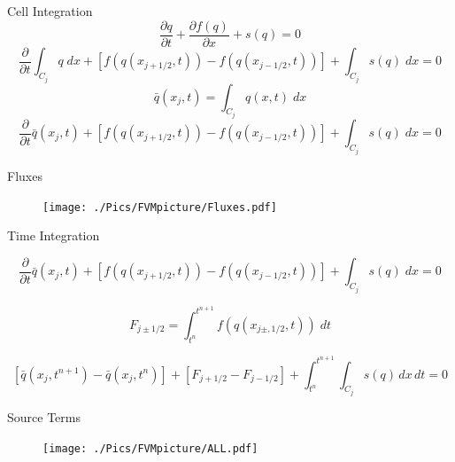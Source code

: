\documentclass[pdf]{beamer}
\begin{document}
\begin{frame}{Cell Integration}
	\begin{equation*}
	\frac{\partial q}{\partial t} + \frac{\partial f(q)}{\partial x} + s(q) = 0
	\end{equation*}
	\begin{equation*}
	\frac{\partial}{\partial t} \int_{C_j} q \; dx + \left[f(q(x_{j+1/2},t)) - f(q(x_{j-1/2},t))  \right] + \int_{C_j} s(q) \; dx  = 0
	\end{equation*}
	\begin{equation*}
	\bar{q}(x_j,t)= \int_{C_j} q(x,t) \; dx
	\end{equation*}
	\begin{equation*}
	\frac{\partial}{\partial t} \bar{q}(x_j,t) + \left[f(q(x_{j+1/2},t)) - f(q(x_{j-1/2},t))  \right] + \int_{C_j} s(q) \; dx  = 0
	\end{equation*}
\end{frame}
\begin{frame}{Fluxes}
	\begin{figure}
		\texttt{[image: ./Pics/FVMpicture/Fluxes.pdf]}
	\end{figure}
\end{frame}
\begin{frame}{Time Integration}
	
	\begin{equation*}
	\frac{\partial}{\partial t} \bar{q}(x_j,t) + \left[f(q(x_{j+1/2},t)) - f(q(x_{j-1/2},t))  \right] + \int_{C_j} s(q) \; dx  = 0
	\end{equation*}
	
	\begin{equation}
	F_{j \pm 1/2} = \int_{t^n}^{t^{n+1}} f(q(x_{j\pm,1/2},t)) \; dt
	\end{equation}
	
	\begin{equation}
	\left[\bar{q}(x_j,t^{n+1}) - \bar{q}(x_j,t^n)\right]+ \left[F_{j + 1/2} - F_{j - 1/2} \right] +  \int_{t^n}^{t^{n+1}} \int_{C_j} s(q) \, dx \, dt = 0
	\end{equation}
\end{frame}
\begin{frame}{Source Terms}
	\begin{figure}
		\texttt{[image: ./Pics/FVMpicture/ALL.pdf]}
	\end{figure}
\end{frame}
\end{document}

